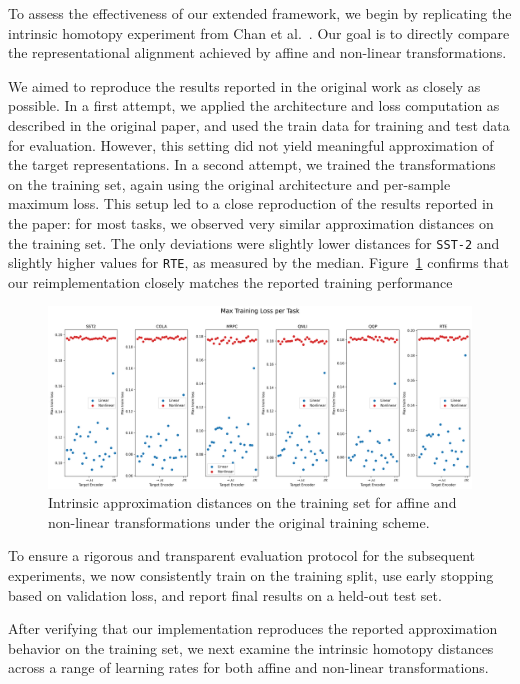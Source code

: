To assess the effectiveness of our extended framework, we begin by replicating the intrinsic homotopy experiment from Chan et al.~\cite{chang_clust_met_space}.
Our goal is to directly compare the representational alignment achieved by affine and non-linear transformations.

We aimed to reproduce the results reported in the original work as closely as possible.
In a first attempt, we applied the architecture and loss computation as described in the original paper, and used the train data for training and test data for evaluation. 
However, this setting did not yield meaningful approximation of the target representations.
In a second attempt, we trained the transformations on the training set, again using the original architecture and per-sample maximum loss. This setup led to a close reproduction of the results reported in the paper: for most tasks, we observed very similar approximation distances on the training set. The only deviations were slightly lower distances for \texttt{SST-2} and slightly higher values for \texttt{RTE}, as measured by the median.
Figure~\ref{fig:baseline-reproduction-trainings-loss} confirms that our reimplementation closely matches the reported training performance

\begin{figure}[h]
	\centering
	\includegraphics[width=\linewidth]{Abschlussarbeit/Pictures/New_all_in_one_scatter_lower_height.png}
	\caption{Intrinsic approximation distances on the training set for affine and non-linear transformations under the original training scheme.}
	\label{fig:baseline-reproduction-trainings-loss}
\end{figure}

To ensure a rigorous and transparent evaluation protocol for the subsequent experiments, we now consistently train on the training split, use early stopping based on validation loss, and report final results on a held-out test set.

After verifying that our implementation reproduces the reported approximation behavior on the training set, we next examine the intrinsic homotopy distances across a range of learning rates for both affine and non-linear transformations.

